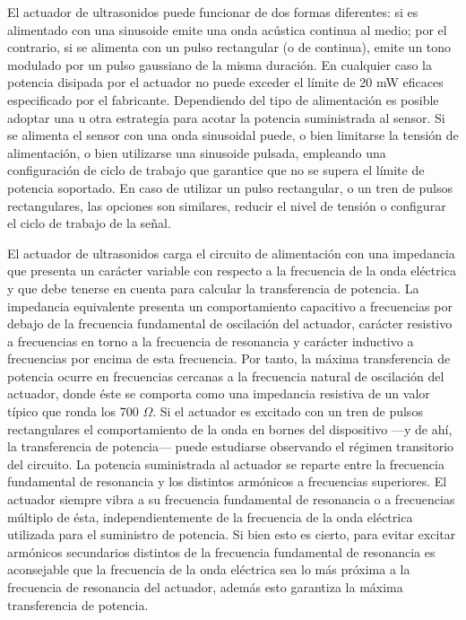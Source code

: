 El actuador de ultrasonidos puede funcionar de dos formas diferentes: si es
alimentado con una sinusoide emite una onda acústica continua al medio; por
el contrario, si se alimenta con un pulso rectangular (o de continua),
emite un tono modulado por un pulso gaussiano de la misma duración. En
cualquier caso la potencia disipada por el actuador no puede exceder el
límite de 20 mW eficaces especificado por el fabricante. Dependiendo del
tipo de alimentación es posible adoptar una u otra estrategia para acotar
la potencia suministrada al sensor. Si se alimenta el sensor con una onda
sinusoidal puede, o bien limitarse la tensión de alimentación, o bien
utilizarse una sinusoide pulsada, empleando una configuración de ciclo de
trabajo que garantice que no se supera el límite de potencia soportado. En
caso de utilizar un pulso rectangular, o un tren de pulsos rectangulares,
las opciones son similares, reducir el nivel de tensión o configurar el
ciclo de trabajo de la señal.

\llongpage{}
El actuador de ultrasonidos carga el circuito de alimentación con una
impedancia que presenta un carácter variable con respecto a la frecuencia
de la onda eléctrica y que debe tenerse en cuenta para calcular la
transferencia de potencia. La impedancia equivalente presenta un
comportamiento capacitivo a frecuencias por debajo de la frecuencia
fundamental de oscilación del actuador, carácter resistivo a frecuencias en
torno a la frecuencia de resonancia y carácter inductivo a frecuencias por
encima de esta frecuencia. Por tanto, la máxima transferencia de potencia
ocurre en frecuencias cercanas a la frecuencia natural de oscilación del
actuador, donde éste se comporta como una impedancia resistiva de un valor
típico que ronda los 700 $\Omega$. Si el actuador es excitado con un tren
de pulsos rectangulares el comportamiento de la onda en bornes del
dispositivo ---y de ahí, la transferencia de potencia--- puede estudiarse
observando el régimen transitorio del circuito. La potencia suministrada al
actuador se reparte entre la frecuencia fundamental de resonancia y los
distintos armónicos a frecuencias superiores. El actuador siempre vibra a
su frecuencia fundamental de resonancia o a frecuencias múltiplo de ésta,
independientemente de la frecuencia de la onda eléctrica utilizada para el
suministro de potencia. Si bien esto es cierto, para evitar excitar
armónicos secundarios distintos de la frecuencia fundamental de resonancia
es aconsejable que la frecuencia de la onda eléctrica sea lo más próxima a
la frecuencia de resonancia del actuador, además esto garantiza la máxima
transferencia de potencia.

